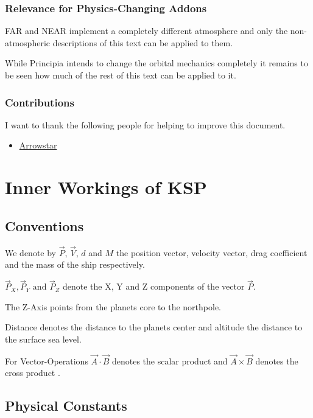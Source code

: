 \documentclass[11pt]{report}
\newcommand{\oa}[1]{\overrightarrow{#1}}
\newcommand{\Pos}{\oa{P}}
\newcommand{\Vel}{\oa{V}}
\begin{document}
\section{Relevance for Physics-Changing Addons}

FAR \cite{FAR} and NEAR \cite{NEAR} implement a completely different
atmosphere and only the non-atmospheric descriptions of this text can
be applied to them.

While Principia \cite{principia} intends to change the orbital
mechanics completely it remains to be seen how much of the rest of
this text can be applied to it.

\section{Contributions}

I want to thank the following people for helping to improve this
document.

\begin{itemize}
\item \href{http://forum.kerbalspaceprogram.com/members/2521}{Arrowstar}
\end{itemize}

\part{Inner Workings of KSP}\label{InnerWorkings}

\chapter{Conventions}

We denote by $\Pos$, $\Vel$, $d$ and $M$ the 
position vector,  velocity vector, drag
coefficient and the mass of the ship respectively.

$\Pos_X, \Pos_Y \textrm{ and } \Pos_Z$ denote the X, Y and Z
components of the vector $\Pos$.

The Z-Axis points from the planets core to the northpole.

Distance denotes the distance to the planets center and altitude the
distance to the surface sea level.

For Vector-Operations $\oa{A} \cdot \oa{B}$ denotes the scalar product
\cite{ScalarProduct} and $\oa{A} \times \oa{B}$ denotes the cross
product \cite{CrossProduct}.

\chapter{Physical Constants}
\end{document}
